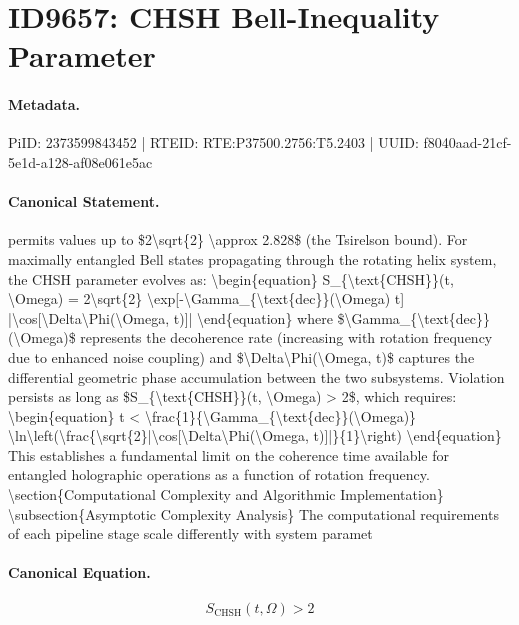 \section*{ID9657: CHSH Bell-Inequality Parameter}
\paragraph{Metadata.}
PiID: 2373599843452 | RTEID: RTE:P37500.2756:T5.2403 | UUID: f8040aad-21cf-5e1d-a128-af08e061e5ac

\paragraph{Canonical Statement.}
permits values up to \$2\textbackslash{}sqrt\{2\} \textbackslash{}approx 2.828\$ (the Tsirelson bound). For maximally entangled Bell states propagating through the rotating helix system, the CHSH parameter evolves as: \textbackslash{}begin\{equation\} S\_\{\textbackslash{}text\{CHSH\}\}(t, \textbackslash{}Omega) = 2\textbackslash{}sqrt\{2\} \textbackslash{}exp[-\textbackslash{}Gamma\_\{\textbackslash{}text\{dec\}\}(\textbackslash{}Omega) t] |\textbackslash{}cos[\textbackslash{}Delta\textbackslash{}Phi(\textbackslash{}Omega, t)]| \textbackslash{}end\{equation\} where \$\textbackslash{}Gamma\_\{\textbackslash{}text\{dec\}\}(\textbackslash{}Omega)\$ represents the decoherence rate (increasing with rotation frequency due to enhanced noise coupling) and \$\textbackslash{}Delta\textbackslash{}Phi(\textbackslash{}Omega, t)\$ captures the differential geometric phase accumulation between the two subsystems. Violation persists as long as \$S\_\{\textbackslash{}text\{CHSH\}\}(t, \textbackslash{}Omega) > 2\$, which requires: \textbackslash{}begin\{equation\} t < \textbackslash{}frac\{1\}\{\textbackslash{}Gamma\_\{\textbackslash{}text\{dec\}\}(\textbackslash{}Omega)\} \textbackslash{}ln\textbackslash{}left(\textbackslash{}frac\{\textbackslash{}sqrt\{2\}|\textbackslash{}cos[\textbackslash{}Delta\textbackslash{}Phi(\textbackslash{}Omega, t)]|\}\{1\}\textbackslash{}right) \textbackslash{}end\{equation\} This establishes a fundamental limit on the coherence time available for entangled holographic operations as a function of rotation frequency. \textbackslash{}section\{Computational Complexity and Algorithmic Implementation\} \textbackslash{}subsection\{Asymptotic Complexity Analysis\} The computational requirements of each pipeline stage scale differently with system paramet

\paragraph{Canonical Equation.}
\[
S_{\text{CHSH}}(t, \Omega) > 2
\]

